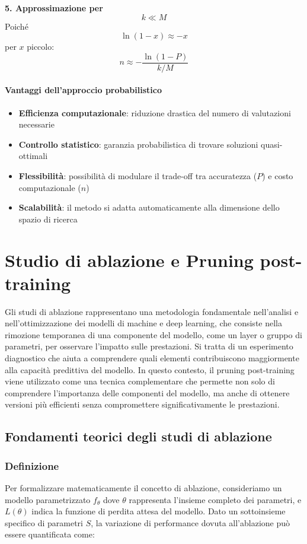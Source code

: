 \documentclass[a4paper,12pt]{report}
\begin{document}
	\textbf{5. Approssimazione per}
	$$k \ll M$$
	Poiché
	$$ \ln(1 - x) \approx -x $$
	per \(x\) piccolo: \\
	$$
	n \approx - \frac{\ln(1 - P)}{k/M}
	$$
	
	\subsubsection{Vantaggi dell'approccio probabilistico}
	\begin{itemize}
		\item \textbf{Efficienza computazionale}: riduzione drastica del numero di valutazioni necessarie
		\item \textbf{Controllo statistico}: garanzia probabilistica di trovare soluzioni quasi-ottimali
		\item \textbf{Flessibilità}: possibilità di modulare il trade-off tra accuratezza ($P$) e costo computazionale ($n$)
		\item \textbf{Scalabilità}: il metodo si adatta automaticamente alla dimensione dello spazio di ricerca
	\end{itemize}
	
	\chapter{Studio di ablazione e Pruning post-training}
	
	Gli studi di ablazione rappresentano una metodologia fondamentale nell'analisi e nell'ottimizzazione dei modelli di machine e deep learning, che consiste nella rimozione temporanea di una componente del modello, come un layer o gruppo di parametri, per osservare l'impatto sulle prestazioni. Si tratta di un esperimento diagnostico che aiuta a comprendere quali elementi contribuiscono maggiormente alla capacità predittiva del modello. In questo contesto, il pruning post-training viene utilizzato come una tecnica complementare che permette non solo di comprendere l'importanza delle componenti del modello, ma anche di ottenere versioni più efficienti senza compromettere significativamente le prestazioni.
	
	\section{Fondamenti teorici degli studi di ablazione}
	
	\subsection{Definizione}
	Per formalizzare matematicamente il concetto di ablazione, consideriamo un modello parametrizzato $f_\theta$ dove $\theta$ rappresenta l'insieme completo dei parametri, e $L(\theta)$ indica la funzione di perdita attesa del modello. Dato un sottoinsieme specifico di parametri $S$, la variazione di performance dovuta all'ablazione può essere quantificata come:
	
\end{document}
